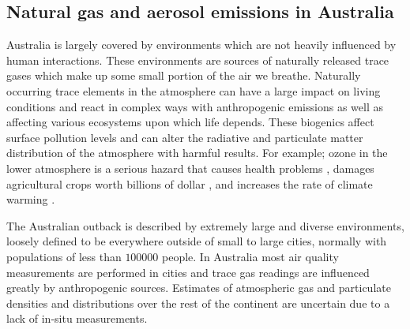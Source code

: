 \subsection{Natural gas and aerosol emissions in Australia}

Australia is largely covered by environments which are not heavily influenced by human interactions.
These environments are sources of naturally released trace gases which make up some small portion of the air we breathe.
Naturally occurring trace elements in the atmosphere can have a large impact on living conditions and react in complex ways with anthropogenic emissions as well as affecting various ecosystems upon which life depends.
These biogenics affect surface pollution levels and can alter the radiative and particulate matter distribution of the atmosphere with harmful results.
For example; ozone in the lower atmosphere is a serious hazard that causes health problems \cite{Hsieh_2013}, damages agricultural crops worth billions of dollar \cite{Avnery_2011}, and increases the rate of climate warming \cite{IPCC_2013_chap8}.

The Australian outback is described by extremely large and diverse environments, loosely defined to be everywhere outside of small to large cities, normally with populations of less than $100000$ people.
In Australia most air quality measurements are performed in cities and trace gas readings are influenced greatly by anthropogenic sources.
Estimates of atmospheric gas and particulate densities and distributions over the rest of the continent are uncertain due to a lack of in-situ measurements.
  